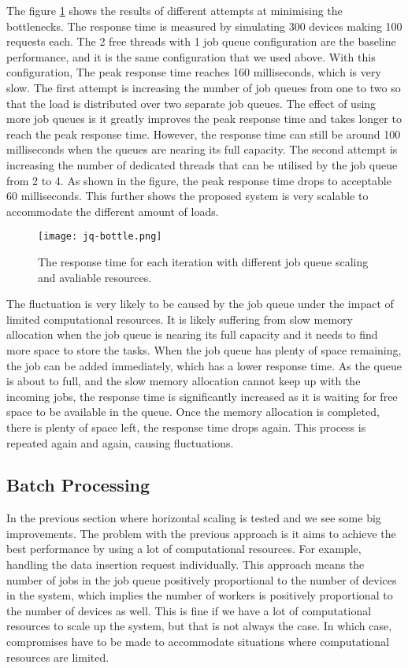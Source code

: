 \documentclass[../thesis.tex]{subfiles}
\begin{document}
The figure \ref{fig:jq-bottle} shows the results of different attempts at minimising the bottlenecks. The response time is measured by simulating 300 devices making 100 requests each. The 2 free threads with 1 job queue configuration are the baseline performance, and it is the same configuration that we used above. With this configuration, The peak response time reaches 160 milliseconds, which is very slow. The first attempt is increasing the number of job queues from one to two so that the load is distributed over two separate job queues. The effect of using more job queues is it greatly improves the peak response time and takes longer to reach the peak response time. However, the response time can still be around 100 milliseconds when the queues are nearing its full capacity. The second attempt is increasing the number of dedicated threads that can be utilised by the job queue from 2 to 4. As shown in the figure, the peak response time drops to acceptable 60 milliseconds. This further shows the proposed system is very scalable to accommodate the different amount of loads.

\begin{figure}[!ht]
\centering
\texttt{[image: jq-bottle.png]}
\caption{The response time for each iteration with different job queue scaling and avaliable resources.}
\label{fig:jq-bottle}
\end{figure}


The fluctuation is very likely to be caused by the job queue under the impact of limited computational resources. It is likely suffering from slow memory allocation when the job queue is nearing its full capacity and it needs to find more space to store the tasks. When the job queue has plenty of space remaining, the job can be added immediately, which has a lower response time. As the queue is about to full, and the slow memory allocation cannot keep up with the incoming jobs, the response time is significantly increased as it is waiting for free space to be available in the queue. Once the memory allocation is completed, there is plenty of space left, the response time drops again. This process is repeated again and again, causing fluctuations.

\subsection{Batch Processing}

In the previous section where horizontal scaling is tested and we see some big improvements. The problem with the previous approach is it aims to achieve the best performance by using a lot of computational resources. For example, handling the data insertion request individually. This approach means the number of jobs in the job queue positively proportional to the number of devices in the system, which implies the number of workers is positively proportional to the number of devices as well. This is fine if we have a lot of computational resources to scale up the system, but that is not always the case. In which case, compromises have to be made to accommodate situations where computational resources are limited.
\end{document}
